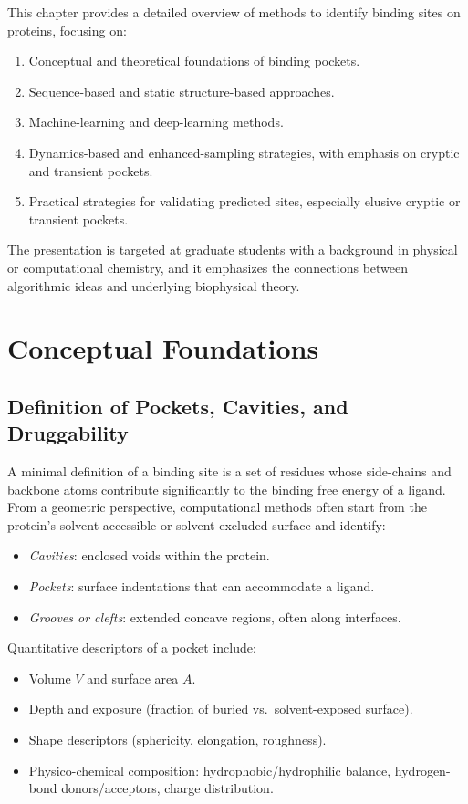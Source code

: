 \documentclass[12pt,a4paper]{article}
\begin{document}
This chapter provides a detailed overview of methods to identify binding sites on proteins, focusing on:
\begin{enumerate}
    \item Conceptual and theoretical foundations of binding pockets.
    \item Sequence-based and static structure-based approaches.
    \item Machine-learning and deep-learning methods.
    \item Dynamics-based and enhanced-sampling strategies, with emphasis on cryptic and transient pockets.
    \item Practical strategies for validating predicted sites, especially elusive cryptic or transient pockets.
\end{enumerate}
The presentation is targeted at graduate students with a background in physical or computational chemistry, and it emphasizes the connections between algorithmic ideas and underlying biophysical theory.

\section{Conceptual Foundations}

\subsection{Definition of Pockets, Cavities, and Druggability}

A minimal definition of a binding site is a set of residues whose side-chains and backbone atoms contribute significantly to the binding free energy of a ligand. From a geometric perspective, computational methods often start from the protein's solvent-accessible or solvent-excluded surface and identify:
\begin{itemize}
    \item \emph{Cavities}: enclosed voids within the protein.
    \item \emph{Pockets}: surface indentations that can accommodate a ligand.
    \item \emph{Grooves or clefts}: extended concave regions, often along interfaces.
\end{itemize}

Quantitative descriptors of a pocket include:
\begin{itemize}
    \item Volume \(V\) and surface area \(A\).
    \item Depth and exposure (fraction of buried vs.\ solvent-exposed surface).
    \item Shape descriptors (sphericity, elongation, roughness).
    \item Physico-chemical composition: hydrophobic/hydrophilic balance, hydrogen-bond donors/acceptors, charge distribution.
\end{itemize}
\end{document}
